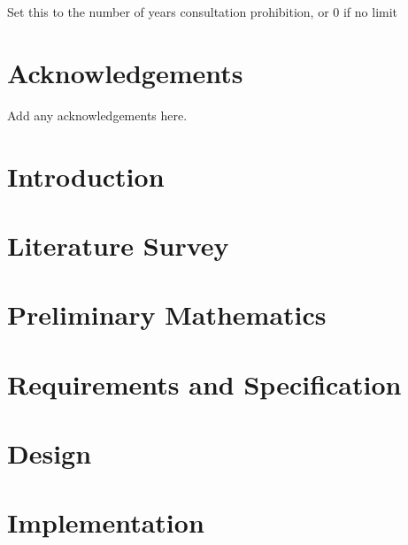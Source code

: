 
\maketitle
\newpage
 Set this to the number of years consultation prohibition, or 0 if no limit
\newpage


\declaration{\disstitle}{\authorname} %
\newpage


\abstract

\newpage


\tableofcontents
\newpage
\listoffigures
\newpage
\listoftables
\newpage

\chapter*{Acknowledgements}
Add any acknowledgements here.
\newpage

\listoftodos

\setcounter{page}{1}



\chapter{Introduction}

\chapter{Literature Survey}

\chapter{Preliminary Mathematics}


\chapter{Requirements and Specification}


\chapter{Design}


\chapter{Implementation}


